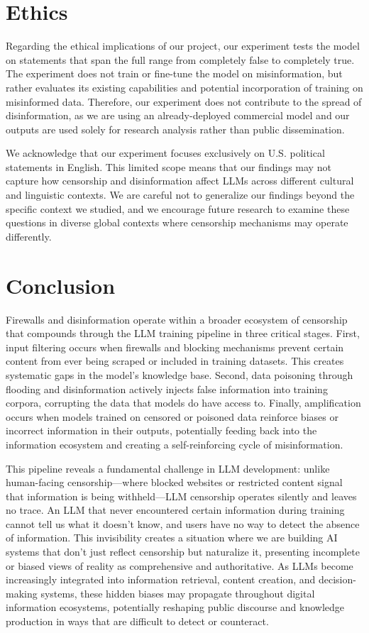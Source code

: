\documentclass[conference=acm]{confpaper}
\begin{document}
\section{Ethics}
Regarding the ethical implications of our project, our experiment tests the model on statements that span the full range from completely false to completely true. The experiment does not train or fine-tune the model on misinformation, but rather evaluates its existing capabilities and potential incorporation of training on misinformed data. Therefore, our experiment does not contribute to the spread of disinformation, as we are using an already-deployed commercial model and our outputs are used solely for research analysis rather than public dissemination.

We acknowledge that our experiment focuses exclusively on U.S. political statements in English. This limited scope means that our findings may not capture how censorship and disinformation affect LLMs across different cultural and linguistic contexts. We are careful not to generalize our findings beyond the specific context we studied, and we encourage future research to examine these questions in diverse global contexts where censorship mechanisms may operate differently.


\section{Conclusion}
Firewalls and disinformation operate within a broader ecosystem of censorship that compounds through the LLM training pipeline in three critical stages. First, input filtering occurs when firewalls and blocking mechanisms prevent certain content from ever being scraped or included in training datasets. This creates systematic gaps in the model's knowledge base. Second, data poisoning through flooding and disinformation actively injects false information into training corpora, corrupting the data that models do have access to. Finally, amplification occurs when models trained on censored or poisoned data reinforce biases or incorrect information in their outputs, potentially feeding back into the information ecosystem and creating a self-reinforcing cycle of misinformation.

This pipeline reveals a fundamental challenge in LLM development: unlike human-facing censorship—where blocked websites or restricted content signal that information is being withheld—LLM censorship operates silently and leaves no trace. An LLM that never encountered certain information during training cannot tell us what it doesn't know, and users have no way to detect the absence of information. This invisibility creates a situation where we are building AI systems that don't just reflect censorship but naturalize it, presenting incomplete or biased views of reality as comprehensive and authoritative. As LLMs become increasingly integrated into information retrieval, content creation, and decision-making systems, these hidden biases may propagate throughout digital information ecosystems, potentially reshaping public discourse and knowledge production in ways that are difficult to detect or counteract.

\label{lastpage}


\newpage
\printbibliography

\vfill
\pagebreak
\end{document}
